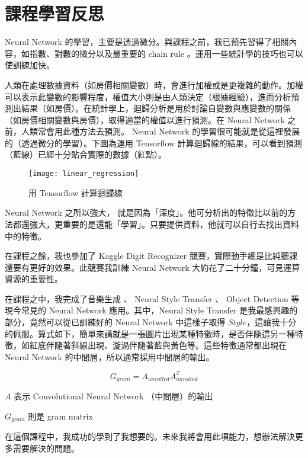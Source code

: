 \chapter*{課程學習反思}
Neural Network 的學習，主要是透過微分。與課程之前，我已預先習得了相關內容，如指數、對數的微分以及最重要的 chain rule 。運用一些統計學的技巧也可以使訓練加快。

人類在處理數據資料（如房價相關變數）時，會進行加權或是更複雜的動作。加權可以表示此變數的影響程度，權值大小則是由人類決定（根據經驗），進而分析預測出結果（如房價）。在統計學上，迴歸分析是用於討論自變數與應變數的關係（如房價相關變數與房價），取得適當的權值以進行預測。在 Neural Network 之前，人類常會用此種方法去預測。 Neural Network 的學習很可能就是從這裡發展的（透過微分的學習）。下圖為運用 Tensorflow 計算迴歸線的結果，可以看到預測（藍線）已經十分貼合實際的數據（紅點）。

\begin{figure}[H]
    \centering
    \caption{用 Tensorflow 計算迴歸線}
    \texttt{[image: linear\_regression]}
\end{figure}



Neural Network 之所以強大， 就是因為「深度」。他可分析出的特徵比以前的方法都還強大，更重要的是還能「學習」。只要提供資料，他就可以自行去找出資料中的特徵。

在課程之餘，我也參加了 Kaggle Digit Recognizer 競賽，實際動手總是比純聽課還要有更好的效果。此競賽我訓練 Neural Network 大約花了二十分鐘，可見運算資源的重要性。

在課程之中，我完成了音樂生成 、 Neural Style Transfer 、 Object Detection 等現今常見的 Neural Network 應用。其中，Neural Style Transfer 是我最感興趣的部分，竟然可以從已訓練好的 Neural Network 中這樣子取得 $ Style $，這讓我十分的佩服。算式如下，簡單來講就是一張圖片出現某種特徵時，是否伴隨這另一種特徵，如紅底伴隨著斜線出現、漩渦伴隨著藍與黃色等。這些特徵通常都出現在 Neural Network 的中間層，所以通常採用中間層的輸出。

\[
    G_{gram} = A_{unrolled} A^{T}_{unrolled}
\]

\begin{center}
    $ A $ 表示 Convolutional Neural Network （中間層）的輸出

    $ G_{gram} $ 則是 gram matrix 
\end{center}

在這個課程中，我成功的學到了我想要的。未來我將會用此項能力，想辦法解決更多需要解決的問題。